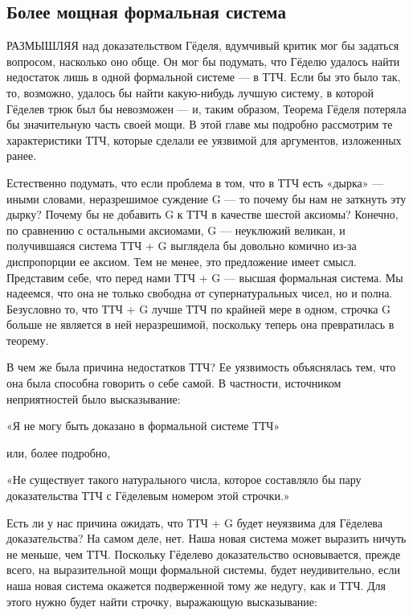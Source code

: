 \documentclass[../main.tex]{subfiles}
\begin{document}

\subsection{Более мощная формальная система}

РАЗМЫШЛЯЯ над доказательством Гёделя, вдумчивый критик мог бы задаться вопросом, насколько оно обще. Он мог бы подумать, что Гёделю удалось найти недостаток лишь в одной формальной системе --- в ТТЧ. Если бы это было так, то, возможно, удалось бы найти какую-нибудь лучшую систему, в которой Гёделев трюк был бы невозможен --- и, таким образом, Теорема Гёделя потеряла бы значительную часть своей мощи. В этой главе мы подробно рассмотрим те характеристики ТТЧ, которые сделали ее уязвимой для аргументов, изложенных ранее.

Естественно подумать, что если проблема в том, что в ТТЧ есть «дырка» --- иными словами, неразрешимое суждение G --- то почему бы нам не заткнуть эту дырку? Почему бы не добавить G к ТТЧ в качестве шестой аксиомы? Конечно, по сравнению с остальными аксиомами, G --- неуклюжий великан, и получившаяся система ТТЧ + G выглядела бы довольно комично из-за диспропорции ее аксиом. Тем не менее, это предложение имеет смысл. Представим себе, что перед нами ТТЧ + G --- высшая формальная система. Мы надеемся, что она не только свободна от супернатуральных чисел, но и полна. Безусловно то, что ТТЧ + G лучше ТТЧ по крайней мере в одном, строчка G больше не является в ней неразрешимой, поскольку теперь она превратилась в теорему.

В чем же была причина недостатков ТТЧ? Ее уязвимость объяснялась тем, что она была способна говорить о себе самой. В частности, источником неприятностей было высказывание:

«Я не могу быть доказано в формальной системе ТТЧ»

или, более подробно,

«Не существует такого натурального числа, которое составляло бы пару доказательства ТТЧ с Гёделевым номером этой строчки.»

Есть ли у нас причина ожидать, что ТТЧ + G будет неуязвима для Гёделева доказательства? На самом деле, нет. Наша новая система может выразить ничуть не меньше, чем ТТЧ. Поскольку Гёделево доказательство основывается, прежде всего, на выразительной мощи формальной системы, будет неудивительно, если наша новая система окажется подверженной тому же недугу, как и ТТЧ. Для этого нужно будет найти строчку, выражающую высказывание:
\end{document}
